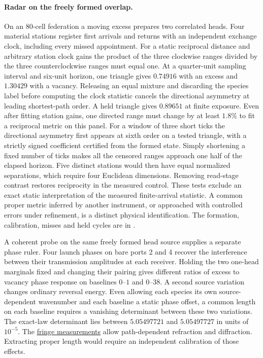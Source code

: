 \documentclass[11pt]{article}
\begin{document}
\paragraph{Radar on the freely formed overlap.}
On an 80-cell federation a moving excess prepares two correlated heads.
Four material stations register first arrivals and returns with an
independent exchange clock, including every missed appointment. For a
static reciprocal distance and arbitrary station clock gains the product
of the three clockwise ranges divided by the three counterclockwise ranges
must equal one. At a quarter-unit sampling interval and six-unit horizon,
one triangle gives $0.74916$ with an excess and $1.30429$ with a vacancy.
Releasing an equal mixture and discarding the species label before
computing the clock statistic cancels the directional asymmetry at
leading shortest-path order. A held triangle gives $0.89651$ at
finite exposure. Even after fitting station gains, one directed range
must change by at least $1.8\%$ to fit a reciprocal metric on this panel.
For a window of three short ticks the directional asymmetry first
appears at sixth order on a tested triangle, with a strictly signed
coefficient certified from the formed state. Simply shortening a
fixed number of ticks makes all the censored ranges approach one
half of the elapsed horizon. Five distinct stations would then have
equal normalized separations, which require four Euclidean dimensions.
Removing read-stage contrast restores reciprocity in the measured
control. These tests exclude
an exact static interpretation of the measured finite-arrival statistic.
A common proper metric inferred by another instrument, or approached
with controlled errors under refinement, is a distinct physical
identification. The formation, calibration, misses and held cycles are
in .

A coherent probe on the same freely formed head source supplies a
separate phase ruler. Four launch phases on bare ports 2 and 4 recover
the interference between their transmission amplitudes at each
receiver. Holding the two one-head marginals fixed and changing their
pairing gives different ratios of excess to vacancy phase response on
baselines $0$--$1$ and $0$--$38$. A second source variation changes
ordinary reversal energy. Even allowing each species its own
source-dependent wavenumber and each baseline a static phase offset,
a common length on each baseline requires a vanishing determinant
between these two variations. The exact-law determinant lies between
$5.05497721$ and $5.05497727$ in units of $10^{-5}$. The
\href{https://github.com/FloatingPragma/observer-patch-holography/tree/main/model/experiments/interval_echo_einstein_station/collar_pairing/fringe_ruler}{fringe measurements}
allow path-dependent refraction and diffraction. Extracting proper
length would require an independent calibration of those effects.
\end{document}
